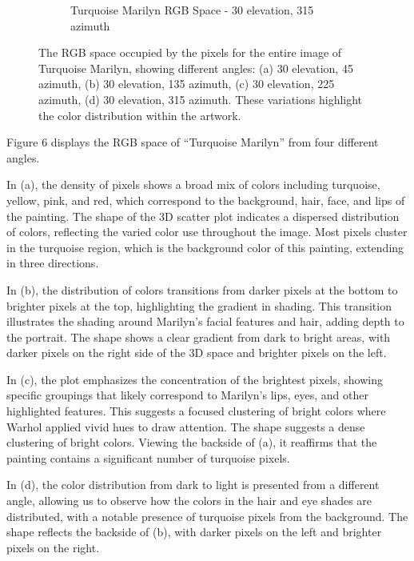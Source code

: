 \documentclass{article}
\begin{document}
\begin{figure}[ht]
\begin{subfigure}{0.45\textwidth}
    \caption{Turquoise Marilyn RGB Space - 30 \degree elevation, 315 \degree azimuth}
    \label{fig:4_12_turq_marilyn_original_scatter}
  \end{subfigure}
  \caption{The RGB space occupied by the pixels for the entire image of Turquoise Marilyn, showing different angles: (a) 30 \degree elevation, 45 \degree azimuth, (b) 30 \degree elevation, 135 \degree azimuth, (c) 30 \degree elevation, 225 \degree azimuth, (d) 30 \degree elevation, 315 \degree azimuth. These variations highlight the color distribution within the artwork.}
  \label{fig:turq_marilyn_original_scatter_2}
\end{figure}

Figure 6 displays the RGB space of ``Turquoise Marilyn'' from four
different angles.

In (a), the density of pixels shows a broad mix of colors including
turquoise, yellow, pink, and red, which correspond to the background,
hair, face, and lips of the painting. The shape of the 3D scatter plot
indicates a dispersed distribution of colors, reflecting the varied
color use throughout the image. Most pixels cluster in the turquoise
region, which is the background color of this painting, extending in
three directions.

In (b), the distribution of colors transitions from darker pixels at the
bottom to brighter pixels at the top, highlighting the gradient in
shading. This transition illustrates the shading around Marilyn's facial
features and hair, adding depth to the portrait. The shape shows a clear
gradient from dark to bright areas, with darker pixels on the right side
of the 3D space and brighter pixels on the left.

In (c), the plot emphasizes the concentration of the brightest pixels,
showing specific groupings that likely correspond to Marilyn's lips,
eyes, and other highlighted features. This suggests a focused clustering
of bright colors where Warhol applied vivid hues to draw attention. The
shape suggests a dense clustering of bright colors. Viewing the backside
of (a), it reaffirms that the painting contains a significant number of
turquoise pixels.

In (d), the color distribution from dark to light is presented from a
different angle, allowing us to observe how the colors in the hair and
eye shades are distributed, with a notable presence of turquoise pixels
from the background. The shape reflects the backside of (b), with darker
pixels on the left and brighter pixels on the right.
\end{document}
